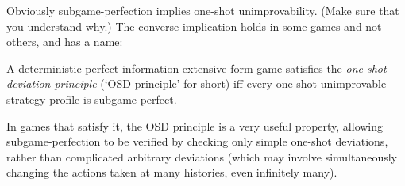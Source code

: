 Obviously subgame-perfection implies one-shot unimprovability. (Make sure that you understand why.) The converse implication holds in some games and not others, and has a name:

\begin{definition}
	\label{definition:osdp}
	A deterministic perfect-information extensive-form game satisfies the \emph{one-shot deviation principle} (`OSD principle' for short) iff every one-shot unimprovable strategy profile is subgame-perfect. 
\end{definition}

In games that satisfy it, the OSD principle is a very useful property, allowing subgame-perfection to be verified by checking only simple one-shot deviations, rather than complicated arbitrary deviations (which may involve simultaneously changing the actions taken at many histories, even infinitely many).

